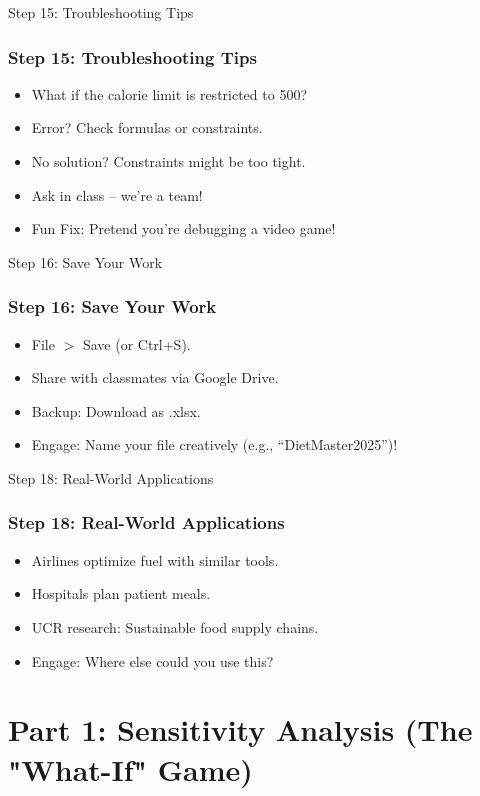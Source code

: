 \documentclass{beamer}
\begin{document}
\begin{frame}{Step 15: Troubleshooting Tips}
\frametitle{Step 15: Troubleshooting Tips}
\begin{itemize}[<+->]
\item What if the calorie limit is restricted to 500?
  \item Error? Check formulas or constraints.
  \item No solution? Constraints might be too tight.
  \item Ask in class – we’re a team!
  \item Fun Fix: Pretend you’re debugging a video game!
\end{itemize}
\end{frame}

\begin{frame}{Step 16: Save Your Work}
\frametitle{Step 16: Save Your Work}
\begin{itemize}
  \item File \(>\) Save (or Ctrl+S).
  \item Share with classmates via Google Drive.
  \item Backup: Download as .xlsx.
  \item Engage: Name your file creatively (e.g., ``DietMaster2025'')!
\end{itemize}
\end{frame}


\begin{frame}{Step 18: Real-World Applications}
\frametitle{Step 18: Real-World Applications}
\begin{itemize}
  \item Airlines optimize fuel with similar tools.
  \item Hospitals plan patient meals.
  \item UCR research: Sustainable food supply chains.
  \item Engage: Where else could you use this?
\end{itemize}
\end{frame}


\section{Part 1: Sensitivity Analysis (The "What-If" Game)}
\end{document}
